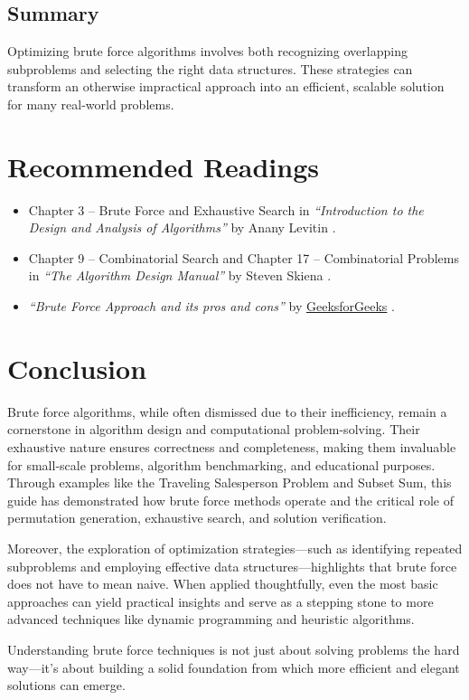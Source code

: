 \documentclass[12pt]{article}
\begin{document}
    \subsection{Summary}
    Optimizing brute force algorithms involves both recognizing overlapping subproblems and selecting the right data structures. These strategies can transform an otherwise impractical approach into an efficient, scalable solution for many real-world problems.

    \section{Recommended Readings}
        \begin{itemize}
            \item Chapter 3 – Brute Force and Exhaustive Search in \textit{``Introduction to the Design and Analysis of Algorithms''} by Anany Levitin \cite{Levitin2012}.
            \item Chapter 9 – Combinatorial Search and Chapter 17 – Combinatorial Problems in \textit{``The Algorithm Design Manual''} by Steven Skiena \cite{skiena2020algorithm}.
            \item \textit{``Brute Force Approach and its pros and cons''} by \href{https://www.geeksforgeeks.org/}{GeeksforGeeks} \cite{geeksforgeeks_brute_force}.
        \end{itemize}

    \section*{Conclusion}
    Brute force algorithms, while often dismissed due to their inefficiency, remain a cornerstone in algorithm design and computational problem-solving. Their exhaustive nature ensures correctness and completeness, making them invaluable for small-scale problems, algorithm benchmarking, and educational purposes. Through examples like the Traveling Salesperson Problem and Subset Sum, this guide has demonstrated how brute force methods operate and the critical role of permutation generation, exhaustive search, and solution verification.

    Moreover, the exploration of optimization strategies—such as identifying repeated subproblems and employing effective data structures—highlights that brute force does not have to mean naive. When applied thoughtfully, even the most basic approaches can yield practical insights and serve as a stepping stone to more advanced techniques like dynamic programming and heuristic algorithms.

    Understanding brute force techniques is not just about solving problems the hard way—it's about building a solid foundation from which more efficient and elegant solutions can emerge.

    
\end{document}
